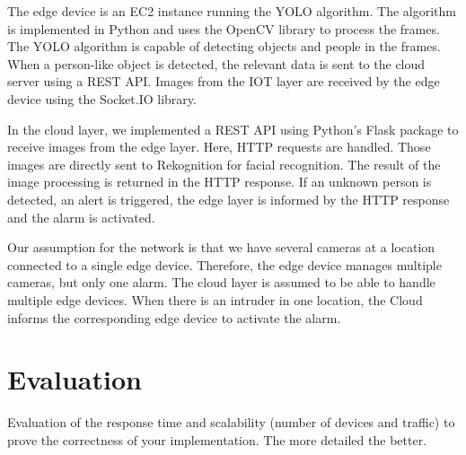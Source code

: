 \documentclass[conference]{IEEEtran}
\begin{document}
The edge device is an EC2 instance running the YOLO algorithm. The algorithm is implemented in Python and uses the OpenCV library to process the frames. The YOLO algorithm is capable of detecting objects and people in the frames. When a person-like object is detected, the relevant data is sent to the cloud server using a REST API. Images from the IOT layer are received by the edge device using the Socket.IO library. 

In the cloud layer, we implemented a REST API using Python's Flask package to receive images from the edge layer. Here, HTTP requests are handled. Those images are directly sent to Rekognition for facial recognition. The result of the image processing is returned in the HTTP response. If an unknown person is detected, an alert is triggered, the edge layer is informed by the HTTP response and the alarm is activated.

Our assumption for the network is that we have several cameras at a location connected to a single edge device. Therefore, the edge device manages multiple cameras, but only one alarm. The cloud layer is assumed to be able to handle multiple edge devices. 
When there is an intruder in one location, the Cloud informs the corresponding edge device to activate the alarm. 




\section{Evaluation}
Evaluation of the response time and scalability (number of devices and traffic) to prove the correctness of your implementation. The more detailed the better. 
\end{document}
